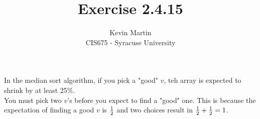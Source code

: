 \documentclass{article}
\author{Kevin Martin\\ CIS675 - Syracuse University}
\title{Exercise 2.4.15}
\begin{document}
\maketitle
In the median sort algorithm, if you pick a "good" $v$, teh array is expected to shrink by at least 25\%. \\
You must pick two $v$'s before you expect to find a "good" one. This is because the expectation of finding a good
$v$ is \(1\over 2\) and two choices result in \({1\over 2} + {1\over 2} = 1\).
\end{document}
